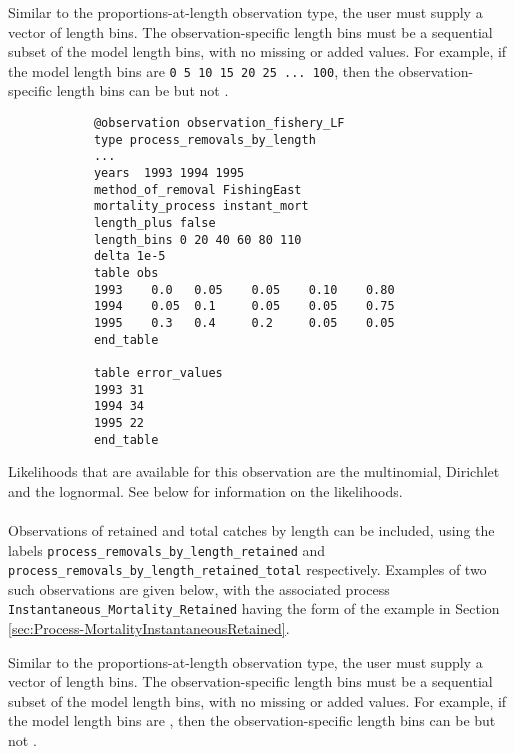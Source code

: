 \begin{itemize}
	Similar to the proportions-at-length observation type, the user must supply a vector of length bins. The observation-specific length bins must be a sequential subset of the model length bins, with no missing or added values. For example, if the model length bins are \texttt{0 5 10 15 20 25 ... 100}, then the observation-specific length bins can be  but not .
	
	{\small{\begin{verbatim}
			@observation observation_fishery_LF
			type process_removals_by_length
			...
			years  1993 1994 1995
			method_of_removal FishingEast
			mortality_process instant_mort
			length_plus false
			length_bins 0 20 40 60 80 110
			delta 1e-5
			table obs
			1993    0.0   0.05    0.05    0.10    0.80
			1994    0.05  0.1     0.05    0.05    0.75
			1995    0.3   0.4     0.2     0.05    0.05
			end_table
			
			table error_values
			1993 31
			1994 34
			1995 22
			end_table
			\end{verbatim}}}
	
	Likelihoods that are available for this observation are the multinomial, Dirichlet and the lognormal. See below for information on the likelihoods.
	
	\paragraph*{}\label{sec:Observation-ProcessRemovalsByLengthRetained}\label{sec:Observation-ProcessRemovalsByLengthRetainedTotal}
	
	Observations of retained and total catches by length can be included, using the labels \texttt{process\_removals\_by\_length\_retained} and \texttt{process\_removals\_by\_length\_retained\_total} respectively. Examples of two such observations are given below, with the associated process \texttt{Instantaneous\_Mortality\_Retained} having the form of the example in Section \ref{sec:Process-MortalityInstantaneousRetained}.
	
	Similar to the proportions-at-length observation type, the user must supply a vector of length bins. The observation-specific length bins must be a sequential subset of the model length bins, with no missing or added values. For example, if the model length bins are , then the observation-specific length bins can be  but not .
	

\end{itemize}
